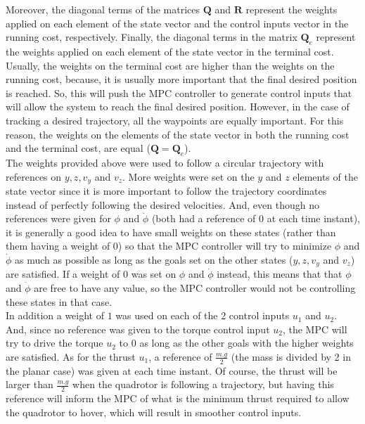 \documentclass{thesisreport}
\begin{document}
Moreover, the diagonal terms of the matrices $\bm{Q}$ and $\bm{R}$ represent the weights applied on each element of the state vector and the control inputs vector in the running cost, respectively. Finally, the diagonal terms in the matrix $\bm{Q}_e$ represent the weights applied on each element of the state vector in the terminal cost. Usually, the weights on the terminal cost are higher than the weights on the running cost, because, it is usually more important that the final desired position is reached. So, this will push the MPC controller to generate control inputs that will allow the system to reach the final desired position. However, in the case of tracking a desired trajectory, all the waypoints are equally important. For this reason, the weights on the elements of the state vector in both the running cost and the terminal cost, are equal ($\bm{Q}=\bm{Q}_e$). \\

The weights provided above were used to follow a circular trajectory with references on $y,z,v_y$ and $v_z$. 
More weights were set on the $y$ and $z$ elements of the state vector since it is more important to follow the trajectory coordinates instead of perfectly following the desired velocities. And, even though no references were given for $\phi$ and $\dot{\phi}$ (both had a reference of $0$ at each time instant), it is generally a good idea to have small weights on these states (rather than them having a weight of 0) so that the MPC controller will try to minimize $\phi$ and $\dot{\phi}$ as much as possible as long as the goals set on the other states ($y,z,v_y$ and $v_z$) are satisfied. If a weight of $0$ was set on $\phi$ and $\dot{\phi}$ instead, this means that that $\phi$ and $\dot{\phi}$ are free to have any value, so the MPC controller would not be controlling these states in that case.\\

In addition a weight of $1$ was used on each of the 2 control inputs $u_1$ and $u_2$. And, since no reference was given to the torque control input $u_2$, the MPC will try to drive the torque $u_2$ to $0$ as long as the other goals with the higher weights are satisfied. As for the thrust $u_1$, a reference of $\frac{m.g}{2}$ (the mass is divided by 2 in the planar case) was given at each time instant. Of course, the thrust will be larger than $\frac{m.g}{2}$ when the quadrotor is following a trajectory, but having this reference will inform the MPC of what is the minimum thrust required to allow the quadrotor to hover, which will result in smoother control inputs. \\
\end{document}
